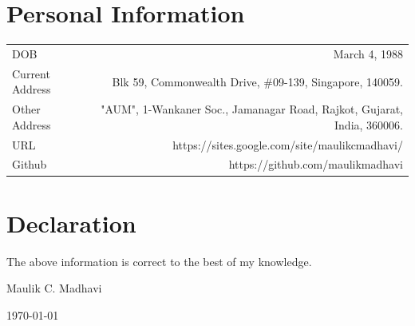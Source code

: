 \documentclass[10pt]{article}
\begin{document}
\section*{Personal Information}
\begin{tabular}{L!{\VRule}R}
	DOB&March 4, 1988\vspace{0.1cm}\\
	Current Address&Blk 59, Commonwealth Drive, \#09-139, Singapore, 140059.\vspace{0.1cm}\\
	Other Address&"AUM", 1-Wankaner Soc., Jamanagar Road, Rajkot, Gujarat, India, 360006.\vspace{0.1cm}\\
	URL&https://sites.google.com/site/maulikcmadhavi/\\
Github&https://github.com/maulikmadhavi\\
\end{tabular} 

\section*{Declaration}
 The above information is correct to the best of my knowledge.
 
\vspace{2cm}
\begin{normalsize}
	\raggedleft
	Maulik C. Madhavi\\
\end{normalsize}
\begin{normalsize}
	\raggedleft	\today	\\
\end{normalsize}
\end{document}
